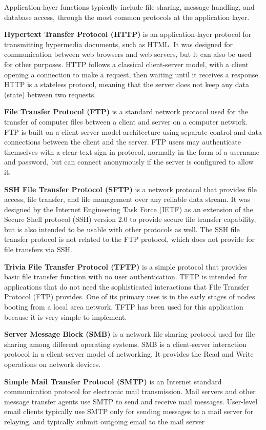 Application-layer functions typically include file sharing, message handling, and database access, through the most
common protocols at the application layer.
\bit
\item \textbf{Hypertext Transfer Protocol (HTTP)} is an application-layer protocol for transmitting hypermedia
documents, such as HTML. It was designed for communication between web browsers and web servers, but it can also be
used for other purposes. HTTP follows a classical client-server model, with a client opening a connection to make a
request, then waiting until it receives a response. HTTP is a stateless protocol, meaning that the server does not
keep any data (state) between two requests.
\item \textbf{File Transfer Protocol (FTP)} is a standard network protocol used for the transfer of computer files
between a client and server on a computer network. FTP is built on a client-server model architecture using separate
control and data connections between the client and the server. FTP users may authenticate themselves with a clear-text
sign-in protocol, normally in the form of a username and password, but can connect anonymously if the server is
configured to allow it.
\item \textbf{SSH File Transfer Protocol (SFTP)} is a network protocol that provides file access, file transfer, and
file management over any reliable data stream. It was designed by the Internet Engineering Task Force (IETF) as an
extension of the Secure Shell protocol (SSH) version 2.0 to provide secure file transfer capability, but is also
intended to be usable with other protocols as well. The SSH file transfer protocol is not related to the FTP protocol,
which does not provide for file transfers via SSH\@.
\item \textbf{Trivia File Transfer Protocol (TFTP)} is a simple protocol that provides basic file transfer function
with no user authentication. TFTP is intended for applications that do not need the sophisticated interactions that
File Transfer Protocol (FTP) provides. One of its primary uses is in the early stages of nodes booting from a local
area network. TFTP has been used for this application because it is very simple to implement.
\item \textbf{Server Message Block (SMB)} is a network file sharing protocol used for file sharing among different
operating systems. SMB is a client-server interaction protocol in a client-server model of networking. It provides the
Read and Write operations on network devices.
\item \textbf{Simple Mail Transfer Protocol (SMTP)} is an Internet standard communication protocol for electronic mail
transmission. Mail servers and other message transfer agents use SMTP to send and receive mail messages. User-level
email clients typically use SMTP only for sending messages to a mail server for relaying, and typically submit outgoing
email to the mail server
\eit

